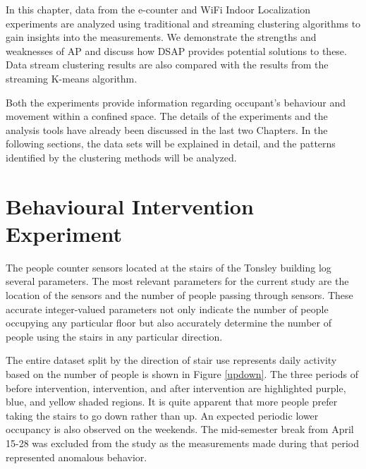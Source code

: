 

In this chapter, data from the e-counter and WiFi Indoor Localization experiments are analyzed using traditional and streaming clustering algorithms to gain insights into the measurements. We demonstrate the strengths and weaknesses of AP and discuss how DSAP provides potential solutions to these. Data stream clustering results are also compared with the results from the streaming K-means algorithm. 

Both the experiments provide information regarding occupant's behaviour and movement within a confined space. The details of the experiments and the analysis tools have already been discussed in the last two Chapters. In the following sections, the data sets will be explained in detail, and the patterns identified by the clustering methods will be analyzed.

 
\section{Behavioural Intervention Experiment} 


The people counter sensors located at the stairs of the Tonsley building log several parameters. The most relevant parameters for the current study are the location of the sensors and the number of people passing through sensors. These accurate integer-valued parameters not only indicate the number of people occupying any particular floor but also accurately determine the number of people using the stairs in any particular direction.

The entire dataset split by the direction of stair use represents daily activity based on the number of people is shown in Figure \ref{updown}. The three periods of before intervention, intervention, and after intervention are highlighted  purple, blue, and yellow shaded regions. It is quite apparent that more people prefer taking the stairs to go down rather than up. An expected periodic lower occupancy is also observed on the weekends. The mid-semester break from April 15-28 was excluded from the study as the measurements made during that period represented anomalous behavior.


